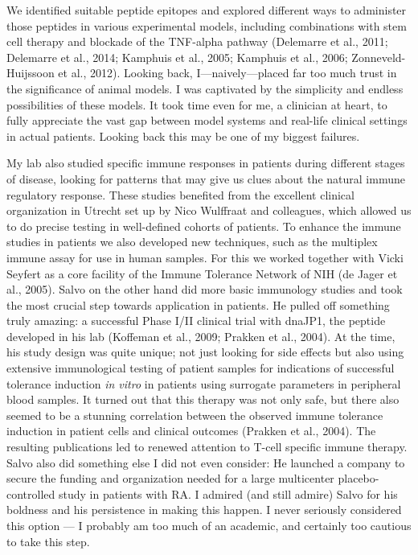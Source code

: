 \documentclass[authordate, editorial]{jote-new-article}
\begin{document}
	We identified suitable peptide epitopes and explored different ways to administer those peptides in various experimental models, including combinations with stem cell therapy and blockade of the TNF-alpha pathway (Delemarre et al., 2011; Delemarre et al., 2014; Kamphuis et al., 2005; Kamphuis et al., 2006; Zonneveld-Huijssoon et al., 2012). Looking back, I—naively—placed far too much trust in the significance of animal models. I was captivated by the simplicity and endless possibilities of these models. It took time even for me, a clinician at heart, to fully appreciate the vast gap between model systems and real-life clinical settings in actual patients. Looking back this may be one of my biggest failures.







	My lab also studied specific immune responses in patients during different stages of disease, looking for patterns that may give us clues about the natural immune regulatory response. These studies benefited from the excellent clinical organization in Utrecht set up by Nico Wulffraat and colleagues, which allowed us to do precise testing in well-defined cohorts of patients. To enhance the immune studies in patients we also developed new techniques, such as the multiplex immune assay for use in human samples. For this we worked together with Vicki Seyfert as a core facility of the Immune Tolerance Network of NIH (de Jager et al., 2005). Salvo on the other hand did more basic immunology studies and took the most crucial step towards application in patients. He pulled off something truly amazing: a successful Phase I/II clinical trial with dnaJP1, the peptide developed in his lab (Koffeman et al., 2009; Prakken et al., 2004). At the time, his study design was quite unique; not just looking for side effects but also using extensive immunological testing of patient samples for indications of successful tolerance induction \emph{in vitro} in patients using surrogate parameters in peripheral blood samples. It turned out that this therapy was not only safe, but there also seemed to be a stunning correlation between the observed immune tolerance induction in patient cells and clinical outcomes (Prakken et al., 2004). The resulting publications led to renewed attention to T-cell specific immune therapy. Salvo also did something else I did not even consider: He launched a company to secure the funding and organization needed for a large multicenter placebo-controlled study in patients with RA. I admired (and still admire) Salvo for his boldness and his persistence in making this happen. I never seriously considered this option — I probably am too much of an academic, and certainly too cautious to take this step.
\end{document}
